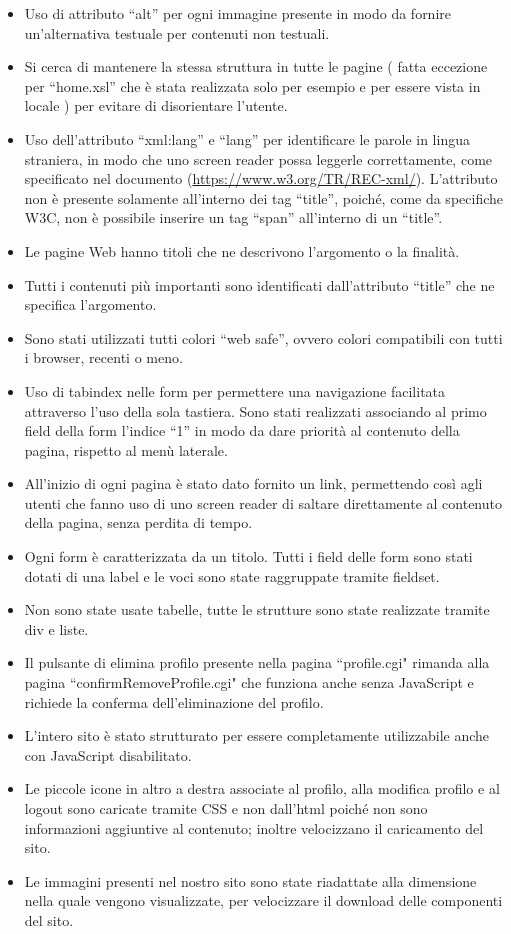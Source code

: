 \documentclass[12pt]{article}
\begin{document}
\begin{itemize}
	\item Uso di attributo “alt” per ogni immagine presente in modo da fornire un’alternativa testuale per contenuti non testuali.
	\item Si cerca di mantenere la stessa struttura in tutte le pagine ( fatta eccezione per “home.xsl” che è stata realizzata solo per esempio e per essere vista in locale ) per evitare di disorientare l’utente. 
	\item Uso dell'attributo “xml:lang” e “lang” per identificare le parole in lingua straniera, in modo che uno screen reader possa leggerle correttamente, come specificato nel documento (\url{https://www.w3.org/TR/REC-xml/}). L’attributo non è presente solamente all’interno dei tag “title”, poiché, come da specifiche W3C, non è possibile inserire un tag “span” all’interno di un “title”.
	\item Le pagine Web hanno titoli che ne descrivono l’argomento o la finalità.
	\item Tutti i contenuti più importanti sono identificati dall’attributo “title” che ne specifica l'argomento.
	\item Sono stati utilizzati tutti colori “web safe”, ovvero colori compatibili con tutti i browser, recenti o meno.
	\item Uso di tabindex nelle form per permettere una navigazione facilitata attraverso l’uso della sola tastiera. Sono stati realizzati associando al primo field della form l’indice “1” in modo da dare priorità al contenuto della pagina, rispetto al menù laterale.
	\item All’inizio di ogni pagina è stato dato fornito un link, permettendo così agli utenti che fanno uso di uno screen reader di saltare direttamente al contenuto della pagina, senza perdita di tempo.
	\item Ogni form è caratterizzata da un titolo. Tutti i field delle form sono stati dotati di una label e le voci sono state raggruppate tramite fieldset.
	\item Non sono state usate tabelle, tutte le strutture sono state realizzate tramite div e liste.
	\item Il pulsante di elimina profilo presente nella pagina “profile.cgi" rimanda alla pagina “confirmRemoveProfile.cgi" che funziona anche senza JavaScript e richiede la conferma dell’eliminazione del profilo.
	\item L'intero sito è stato strutturato per essere completamente utilizzabile anche con JavaScript disabilitato.
	\item Le piccole icone in altro a destra associate al profilo, alla modifica profilo e al logout sono caricate tramite CSS e non dall'html poiché non sono informazioni aggiuntive al contenuto; inoltre velocizzano il caricamento del sito.
	\item Le immagini presenti nel nostro sito sono state riadattate alla dimensione nella quale vengono visualizzate, per velocizzare il download delle componenti del sito.
\end{itemize}
	
\end{document}
